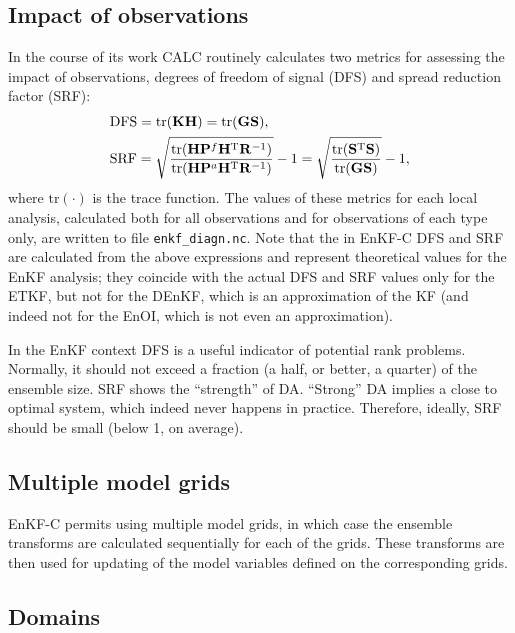 \documentclass[11pt]{report}
\newcommand{\mb} {\mathbf}
\newcommand{\T}{^{\tiny \mathrm T}}
\begin{document}
\subsection{Impact of observations}
\label{sec:impact}

In the course of its work CALC routinely calculates two metrics for assessing the impact of observations, degrees of freedom of signal (DFS) and spread reduction factor (SRF):
\begin{align*}
  & \mathrm{DFS} = \mathrm{tr}(\mb K \mb H) = \mathrm{tr}(\mb G \mb S), \\
  & \mathrm{SRF} = \sqrt{\frac{\mathrm{tr}(\mb H \mb P^f \mb H\T \mb R^{-1})}{\mathrm{tr}(\mb H \mb P^a \mb H\T \mb R^{-1})}} - 1 = \sqrt{\frac{\mathrm{tr}(\mb S\T \mb S)}{\mathrm{tr}(\mb G \mb S)}} - 1,
\end{align*}
where $\mathrm{tr}(\cdot)$ is the trace function.
The values of these metrics for each local analysis, calculated both for all observations and for observations of each type only, are written to file \verb|enkf_diagn.nc|.
Note that the in EnKF-C DFS and SRF are calculated from the above expressions and represent theoretical values for the EnKF analysis; they coincide with the actual DFS and SRF values only for the ETKF, but not for the DEnKF, which is an approximation of the KF (and indeed not for the EnOI, which is not even an approximation).

In the EnKF context DFS is a useful indicator of potential rank problems.
Normally, it should not exceed a fraction (a half, or better, a quarter) of the ensemble size.
SRF shows the ``strength'' of DA.
``Strong'' DA implies a close to optimal system, which indeed never happens in practice.
Therefore, ideally, SRF should be small (below 1, on average).

\subsection{Multiple model grids}

EnKF-C permits using multiple model grids, in which case the ensemble transforms are calculated sequentially for each of the grids.
These transforms are then used for updating of the model variables defined on the corresponding grids.

\subsection{Domains}
\end{document}
